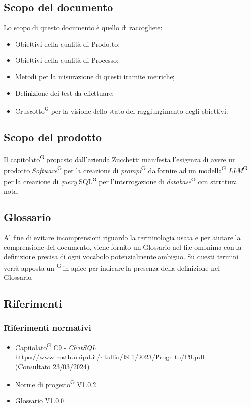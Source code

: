 \documentclass[5pt]{article}
\begin{document}
	\subsection{Scopo del documento}
	Lo scopo di questo documento è quello di raccogliere:
	\begin{itemize}
		\item Obiettivi della qualità di Prodotto;
		\item Obiettivi della qualità di Processo;
		\item Metodi per la misurazione di questi tramite metriche;
		\item Definizione dei test da effettuare;
		\item Cruscotto\textsuperscript{G} per la visione dello stato del raggiungimento degli obiettivi;
	\end{itemize}
	
	\subsection{Scopo del prodotto}
	Il capitolato\textsuperscript{G} proposto dall'azienda Zucchetti manifesta l'esigenza di avere un prodotto \textit{Software}\textsuperscript{G} per la creazione di \textit{prompt}\textsuperscript{G} da fornire ad un modello\textsuperscript{G} \textit{LLM}\textsuperscript{G} per la creazione di \textit{query} SQL\textsuperscript{G} per l'interrogazione di \textit{database}\textsuperscript{G} con struttura nota.
	
	\subsection{Glossario}
	Al fine di evitare incomprensioni riguardo la terminologia usata e per aiutare la comprensione del documento,
	viene fornito un Glossario nel file omonimo con la definizione precisa di ogni vocabolo potenzialmente ambiguo. Su questi termini verrà apposta un \textsuperscript{G} in apice per indicare la presenza della definizione nel Glossario.
	
	\subsection{Riferimenti}
	\subsubsection{Riferimenti normativi}
	\begin{itemize}
		\item Capitolato\textsuperscript{G} C9 - \textit{ChatSQL} \\ \url{https://www.math.unipd.it/~tullio/IS-1/2023/Progetto/C9.pdf} \\ (Consultato 23/03/2024)
		\item Norme di progetto\textsuperscript{G} V1.0.2
		\item Glossario V1.0.0
	\end{itemize}
\end{document}
